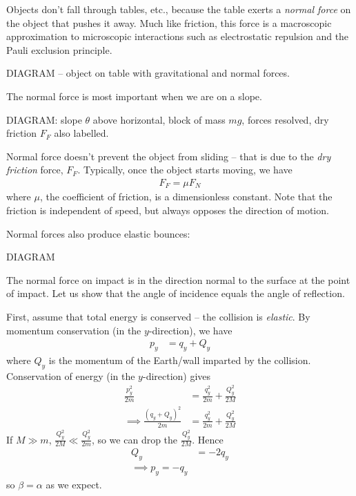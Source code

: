 \documentclass{../../template/note}
\begin{document}
    Objects don't fall through tables, etc., because the table exerts a \emph{normal force} on the object that pushes it away. Much like friction, this force is a macroscopic approximation to microscopic interactions such as electrostatic repulsion and the Pauli exclusion principle.

    DIAGRAM -- object on table with gravitational and normal forces.

    The normal force is most important when we are on a slope.

    DIAGRAM: slope \(\theta\) above horizontal, block of mass \(mg\), forces resolved, dry friction \(F_F\) also labelled.

    Normal force doesn't prevent the object from sliding -- that is due to the \emph{dry friction} force, \(F_F\). Typically, once the object starts moving, we have
    \begin{align*}
        F_F = \mu F_N
    \end{align*}
    where \(\mu\), the coefficient of friction, is a dimensionless constant. Note that the friction is independent of speed, but always opposes the direction of motion.

    Normal forces also produce elastic bounces:

    DIAGRAM

    The normal force on impact is in the direction normal to the surface at the point of impact. Let us show that the angle of incidence equals the angle of reflection.

    First, assume that total energy is conserved -- the collision is \emph{elastic}. By momentum conservation (in the \(y\)-direction), we have
    \begin{align*}
        p_y &= q_y + Q_y
    \end{align*}
    where \(Q_y\) is the momentum of the Earth/wall imparted by the collision. Conservation of energy (in the \(y\)-direction) gives
    \begin{align*}
        \frac{p_y^2}{2m} &= \frac{q_y^2}{2m} + \frac{Q_y^2}{2M} \\
        \implies \frac{(q_y+Q_y)^2}{2m} &= \frac{q_y^2}{2m} + \frac{Q_y^2}{2M}
    \end{align*}
    If \(M \gg m\), \(\frac{Q_y^2}{2M} \ll \frac{Q_y^2}{2m}\), so we can drop the \(\frac{Q_y^2}{2M}\). Hence
    \begin{align*}
        Q_y &= -2q_y \\
        \implies p_y = -q_y
    \end{align*}
    so \(\beta = \alpha\) as we expect.
\end{document}
